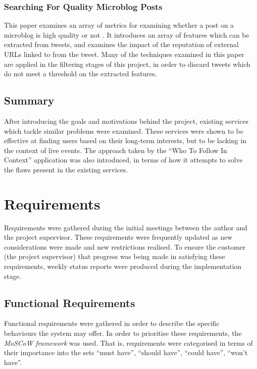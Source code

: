 \documentclass{l4proj}
\begin{document}

    \subsection{Searching For Quality Microblog Posts}
    This paper examines an array of metrics for examining whether a post on a microblog is high quality or not \cite{Vosecky2012}. It introduces an array of features which can be extracted from tweets, and examines the impact of the reputation of external URLs linked to from the tweet. Many of the techniques examined in this paper are applied in the filtering stages of this project, in order to discard tweets which do not meet a threshold on the extracted features.
    
\section{Summary}
After introducing the goals and motivations behind the project, existing services which tackle similar problems were examined. These services were shown to be effective at finding users based on their long-term interests, but to be lacking in the context of live events. The approach taken by the ``Who To Follow In Context'' application was also introduced, in terms of how it attempts to solve the flaws present in the existing services.

\chapter{Requirements}

Requirements were gathered during the initial meetings between the author and the project supervisor. These requirements were frequently updated as new considerations were made and new restrictions realised. To ensure the customer (the project supervisor) that progress was being made in satisfying these requirements, weekly status reports were produced during the implementation stage. 

    \section{Functional Requirements}
    
    Functional requirements were gathered in order to describe the specific behaviours the system may offer. In order to prioritise these requirements, the \textit{MoSCoW framework} was used. That is, requirements were categorised in terms of their importance into the sets ``must have'', ``should have'', ``could have'', ``won't have''.
    
\end{document}

